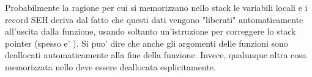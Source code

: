 



\EN{}
\RU{}
\PTBR{}





Probabilmente la ragione per cui si memorizzano nello stack le variabili locali e i record SEH deriva dal fatto che questi dati vengono "liberati" automaticamente all'uscita dalla funzione,
usando soltanto un'istruzione per correggere lo stack pointer (spesso e' \ADD).
Si puo' dire che anche gli argomenti delle funzioni sono deallocati automaticamente alla fine della funzione.
Invece, qualunque altra cosa memorizzata nello  deve essere deallocata esplicitamente.

\EN{}
\RU{}
\PTBR{}


